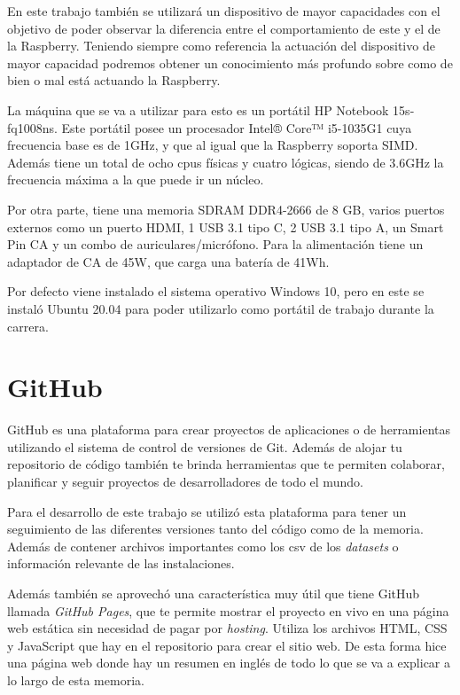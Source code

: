 \documentclass[a4paper, 12pt]{book}
\begin{document}
En este trabajo también se utilizará un dispositivo de mayor capacidades con el objetivo de poder observar la diferencia entre el comportamiento de este y el de la Raspberry. Teniendo siempre como referencia la actuación del dispositivo de mayor capacidad podremos obtener un conocimiento más profundo sobre como de bien o mal está actuando la Raspberry. 

La máquina que se va a utilizar para esto es un portátil HP Notebook 15s-fq1008ns. Este portátil posee un procesador Intel® Core™ i5-1035G1 cuya frecuencia base es de 1GHz, y que al igual que la Raspberry soporta SIMD. Además tiene un total de ocho cpus físicas y cuatro lógicas, siendo de 3.6GHz la frecuencia máxima a la que puede ir un núcleo. 

Por otra parte, tiene una memoria SDRAM DDR4-2666 de 8 GB, varios puertos externos como un puerto HDMI, 1 USB 3.1 tipo C, 2 USB 3.1 tipo A, un Smart Pin CA y un combo de auriculares/micrófono. Para la alimentación tiene un adaptador de CA de 45W, que carga una batería de 41Wh.

Por defecto viene instalado el sistema operativo Windows 10, pero en este se instaló Ubuntu 20.04 para poder utilizarlo como portátil de trabajo durante la carrera. 


\section{GitHub}
\label{sec:github}

GitHub es una plataforma para crear proyectos de aplicaciones o de herramientas utilizando el sistema de control de versiones de Git. Además de alojar tu repositorio de código también te brinda herramientas que te permiten colaborar, planificar y seguir proyectos de desarrolladores de todo el mundo.

Para el desarrollo de este trabajo se utilizó esta plataforma para tener un seguimiento de las diferentes versiones tanto del código como de la memoria. Además de contener archivos importantes como los csv de los \textit{datasets} o información relevante de las instalaciones.

Además también se aprovechó una característica muy útil que tiene GitHub llamada \textit{GitHub Pages}, que te permite mostrar el proyecto en vivo en una página web estática sin necesidad de pagar por \textit{hosting}. Utiliza los archivos HTML, CSS y JavaScript que hay en el repositorio para crear el sitio web. De esta forma hice una página web donde hay un resumen en inglés de todo lo que se va a explicar a lo largo de esta memoria. 
\end{document}
